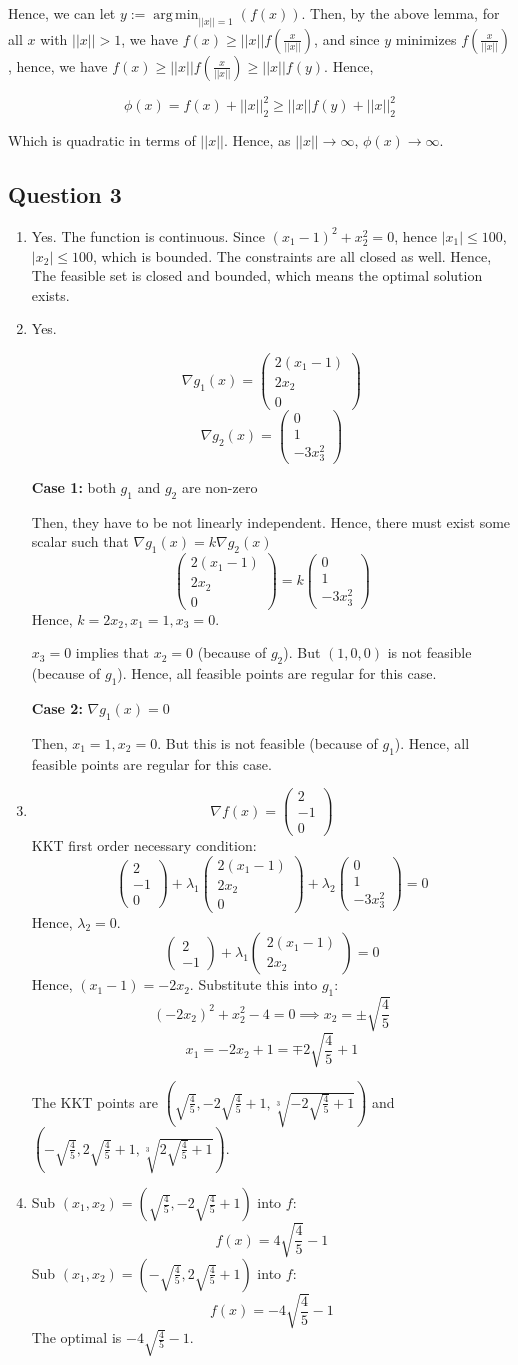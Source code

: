\documentclass{article}
\newcommand{\vv}[2]{\begin{pmatrix}#1\\#2\end{pmatrix}}
\newcommand{\vvv}[3]{\begin{pmatrix}#1\\#2\\#3\end{pmatrix}}
\DeclareMathOperator*{\argmin}{arg\,min}
\begin{document}
Hence, we can let $y := \argmin_{||x||=1} (f(x))$. Then, by the above lemma, for all $x$ with $||x||>1$, we have $f(x) \geq ||x||f(\frac{x}{||x||})$, and since $y$ minimizes $f(\frac{x}{||x||})$, hence, we have $f(x) \geq ||x||f(\frac{x}{||x||}) \geq ||x||f(y)$. Hence,

\[\phi(x) = f(x) + ||x||_2^2 \geq ||x||f(y) + ||x||_2^2\]

Which is quadratic in terms of $||x||$. Hence, as $||x|| \to \infty$, $\phi(x) \to \infty$.

\subsection*{Question 3}

\begin{enumerate}[label=(\alph*)]
\item Yes. The function is continuous. Since $(x_1-1)^2 + x_2^2 = 0$, hence $|x_1| \leq 100$, $|x_2| \leq 100$, which is bounded. The constraints are all closed as well. Hence, The feasible set is closed and bounded, which means the optimal solution exists.
\item
    Yes.
    
    \[\nabla g_1(x) = \vvv{2(x_1-1)}{2x_2}{0}\]
    \[\nabla g_2(x) = \vvv{0}{1}{-3x_3^2}\]
    
    \textbf{Case 1:} both $g_1$ and $g_2$ are non-zero
    
    Then, they have to be not linearly independent. Hence, there must exist some scalar such that $\nabla g_1(x) = k \nabla g_2(x)$
    \[\vvv{2(x_1-1)}{2x_2}{0} = k \vvv{0}{1}{-3x_3^2}\]
    Hence, $k=2x_2, x_1=1, x_3=0$.
    
    $x_3=0$ implies that $x_2=0$ (because of $g_2$). But $(1,0,0)$ is not feasible (because of $g_1$). Hence, all feasible points are regular for this case.
    
    \textbf{Case 2:} $\nabla g_1(x) = 0$
    
    Then, $x_1=1, x_2=0$. But this is not feasible (because of $g_1$). Hence, all feasible points are regular for this case.
    
\item
    \[\nabla f(x) = \vvv{2}{-1}{0}\]
    KKT first order necessary condition:
    \[\vvv{2}{-1}{0} + \lambda_1 \vvv{2(x_1-1)}{2x_2}{0} + \lambda_2 \vvv{0}{1}{-3x_3^2} = 0\]
    Hence, $\lambda_2=0$.
    \[\vv{2}{-1} + \lambda_1 \vv{2(x_1-1)}{2x_2} = 0\]
    Hence, $(x_1-1) = -2x_2$. Substitute this into $g_1$:
    \[(-2x_2)^2 + x_2^2 - 4 = 0 \implies x_2 = \pm \sqrt{\frac{4}{5}}\]
    \[x_1 = -2x_2+1 = \mp 2\sqrt{\frac{4}{5}} + 1\]
    
    The KKT points are $(\sqrt{\frac{4}{5}}, -2\sqrt{\frac{4}{5}} + 1, \sqrt[3]{-2\sqrt{\frac{4}{5}} + 1})$ and $(-\sqrt{\frac{4}{5}}, 2\sqrt{\frac{4}{5}} + 1, \sqrt[3]{2\sqrt{\frac{4}{5}} + 1})$.
\item
    Sub $(x_1,x_2) = (\sqrt{\frac{4}{5}}, -2\sqrt{\frac{4}{5}} + 1)$ into $f$:
    \[f(x)=4\sqrt{\frac{4}{5}}-1\]
    Sub $(x_1,x_2) = (-\sqrt{\frac{4}{5}}, 2\sqrt{\frac{4}{5}} + 1)$ into $f$:
    \[f(x)=-4\sqrt{\frac{4}{5}}-1\]
    The optimal is $-4\sqrt{\frac{4}{5}}-1$.
    
\end{enumerate}
\end{document}
